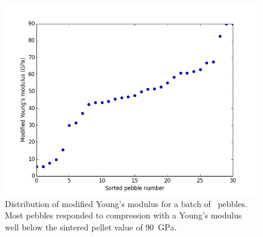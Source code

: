 \begin{figure}[!t]
\centering
    \includegraphics[width=\doubleimagewidth]{chapters/figures/fzk-E-plot.png}
    \caption{Distribution of modified Young's modulus for a batch of \lis~pebbles. Most pebbles responded to compression with a Young's modulus well below the sintered pellet value of \si{90 GPa}.}
    \label{fig:fzk-E-plot}
\end{figure}

